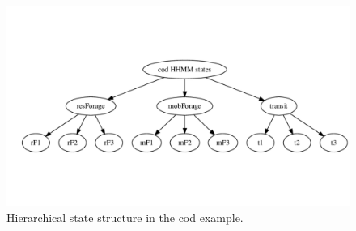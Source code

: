 \documentclass[12pt]{article}\usepackage[]{graphicx}\usepackage[]{xcolor}
\begin{document}
\begin{figure}[htbp]
  \centering
  \includegraphics[width=\textwidth]{codStates.pdf}
  \caption{Hierarchical state structure in the cod example.}
  \label{fig:codStates}
\end{figure}
\end{document}
